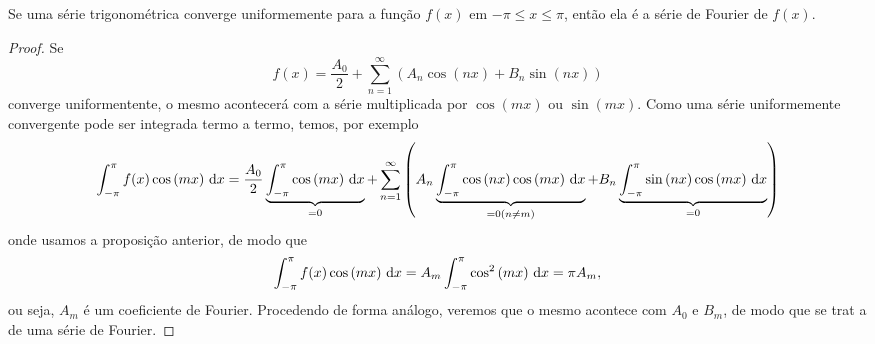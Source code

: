 \begin{teo}
  Se uma série trigonométrica converge uniformemente para a função $f(x)$ em
  $-\pi \leq x \leq \pi$, então ela é a série de Fourier de $f(x)$.
\end{teo}
\begin{proof}
  Se
  \begin{dmath*}
    f(x) = \frac{A_0}{2} + \sum_{n = 1}^\infty \left( A_n \cos\left( n x \right)
    + B_n \sin\left( n x \right) \right)
  \end{dmath*}
  converge uniformentente, o mesmo acontecerá com a série multiplicada por
  $\cos\left( m x \right)$ ou $\sin\left( m x \right)$. Como uma série
  uniformemente convergente pode ser integrada termo a termo, temos, por exemplo
  \begin{dmath*}
      \int_{-\pi}^\pi f(x) \cos\left( m x \right) \vi{x} = \frac{A_0}{2}
      \underbrace{\int_{-\pi}^\pi \cos\left( m x \right) \vi{x}}_{= 0} + \sum_{n
      = 1}^\infty \left( A_n \underbrace{\int_{-\pi}^\pi \cos\left( n x \right)
      \cos\left( m x \right) \vi{x}}_{= 0 (n \neq m)} + B_n
      \underbrace{\int_{-\pi}^\pi \sin\left( n x \right) \cos\left( m x \right)
      \vi{x}}_{= 0} \right)
  \end{dmath*}
  onde usamos a proposição anterior, de modo que
  \begin{dmath*}
    \int_{-\pi}^\pi f(x) \cos\left( m x \right) \vi{x} = A_m \int_{-\pi}^\pi
    \cos^2\left( m x \right) \vi{x} = \pi A_m,
  \end{dmath*}
  ou seja, $A_m$ é um coeficiente de Fourier. Procedendo de forma análogo,
  veremos que o mesmo acontece com $A_0$ e $B_m$, de modo que se trat a de uma
  série de Fourier.
\end{proof}

